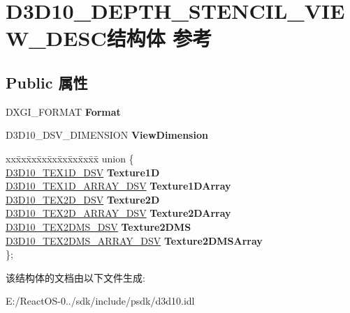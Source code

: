 \hypertarget{struct_d3_d10___d_e_p_t_h___s_t_e_n_c_i_l___v_i_e_w___d_e_s_c}{}\section{D3\+D10\+\_\+\+D\+E\+P\+T\+H\+\_\+\+S\+T\+E\+N\+C\+I\+L\+\_\+\+V\+I\+E\+W\+\_\+\+D\+E\+S\+C结构体 参考}
\label{struct_d3_d10___d_e_p_t_h___s_t_e_n_c_i_l___v_i_e_w___d_e_s_c}
\subsection*{Public 属性}
\begin{DoxyCompactItemize}
\item 
\mbox{\label{struct_d3_d10___d_e_p_t_h___s_t_e_n_c_i_l___v_i_e_w___d_e_s_c_a7d649e4cc5c29fb83df066422eb51307}} 
D\+X\+G\+I\+\_\+\+F\+O\+R\+M\+AT {\bfseries Format}
\item 
\mbox{\label{struct_d3_d10___d_e_p_t_h___s_t_e_n_c_i_l___v_i_e_w___d_e_s_c_a2d61421241923b8ea0f98dc73d3eb798}} 
D3\+D10\+\_\+\+D\+S\+V\+\_\+\+D\+I\+M\+E\+N\+S\+I\+ON {\bfseries View\+Dimension}
\item 
\mbox{\label{struct_d3_d10___d_e_p_t_h___s_t_e_n_c_i_l___v_i_e_w___d_e_s_c_afb8ff9f28d8ff78caf2d59445cc63ce5}} 
\begin{tabbing}
xx\=xx\=xx\=xx\=xx\=xx\=xx\=xx\=xx\=\kill
union \{\\
\>\hyperlink{struct_d3_d10___t_e_x1_d___d_s_v}{D3D10\_TEX1D\_DSV} {\bfseries Texture1D}\\
\>\hyperlink{struct_d3_d10___t_e_x1_d___a_r_r_a_y___d_s_v}{D3D10\_TEX1D\_ARRAY\_DSV} {\bfseries Texture1DArray}\\
\>\hyperlink{struct_d3_d10___t_e_x2_d___d_s_v}{D3D10\_TEX2D\_DSV} {\bfseries Texture2D}\\
\>\hyperlink{struct_d3_d10___t_e_x2_d___a_r_r_a_y___d_s_v}{D3D10\_TEX2D\_ARRAY\_DSV} {\bfseries Texture2DArray}\\
\>\hyperlink{struct_d3_d10___t_e_x2_d_m_s___d_s_v}{D3D10\_TEX2DMS\_DSV} {\bfseries Texture2DMS}\\
\>\hyperlink{struct_d3_d10___t_e_x2_d_m_s___a_r_r_a_y___d_s_v}{D3D10\_TEX2DMS\_ARRAY\_DSV} {\bfseries Texture2DMSArray}\\
\}; \\

\end{tabbing}\end{DoxyCompactItemize}


该结构体的文档由以下文件生成\+:\begin{DoxyCompactItemize}
\item 
E\+:/\+React\+O\+S-\/0../sdk/include/psdk/d3d10.\+idl\end{DoxyCompactItemize}
